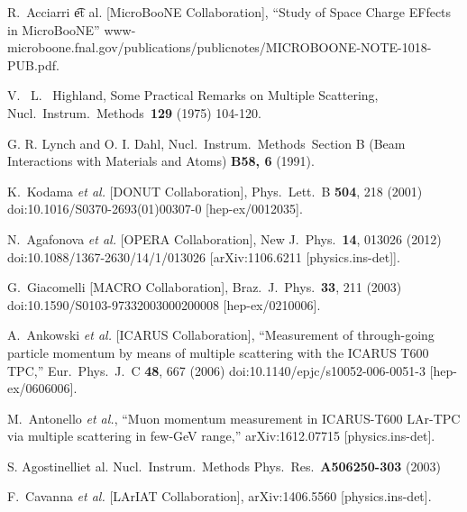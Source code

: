 \documentclass[a4paper,11pt]{article}
\begin{document}
\begin{thebibliography}{99}
  R.~Acciarri {\t et al.} [MicroBooNE Collaboration],
  ``Study of Space Charge EFfects in MicroBooNE''
  www-microboone.fnal.gov/publications/publicnotes/MICROBOONE-NOTE-1018-PUB.pdf.


  V. ~L. ~Highland, 
  Some Practical Remarks on Multiple Scattering, 
  Nucl.\ Instrum.\ Methods\ {\bf 129} (1975)
  104-120.
 
  G. R. Lynch and O. I. Dahl, Nucl.\ Instrum.\ Methods\, 
  Section B (Beam Interactions with Materials and Atoms) {\bf B58, 6} (1991). 

  K.~Kodama {\it et al.} [DONUT Collaboration],
  Phys.\ Lett.\ B {\bf 504}, 218 (2001)
  doi:10.1016/S0370-2693(01)00307-0
  [hep-ex/0012035].

  N.~Agafonova {\it et al.} [OPERA Collaboration],
  New J.\ Phys.\  {\bf 14}, 013026 (2012)
  doi:10.1088/1367-2630/14/1/013026
  [arXiv:1106.6211 [physics.ins-det]].

 
  G.~Giacomelli [MACRO Collaboration],
  Braz.\ J.\ Phys.\  {\bf 33}, 211 (2003)
  doi:10.1590/S0103-97332003000200008
  [hep-ex/0210006].

  A.~Ankowski {\it et al.} [ICARUS Collaboration],
  ``Measurement of through-going particle momentum by means of multiple scattering with the ICARUS T600 TPC,''
  Eur.\ Phys.\ J.\ C {\bf 48}, 667 (2006)
  doi:10.1140/epjc/s10052-006-0051-3
  [hep-ex/0606006].

  M.~Antonello {\it et al.},
  ``Muon momentum measurement in ICARUS-T600 LAr-TPC via multiple scattering in few-GeV range,''
  arXiv:1612.07715 [physics.ins-det].


  S. Agostinelliet al. Nucl.\ Instrum.\ Methods Phys.\ Res.\ {\bf A506250-303} (2003)

  F.~Cavanna {\it et al.} [LArIAT Collaboration],
  arXiv:1406.5560 [physics.ins-det].


\end{thebibliography}
\end{document}
